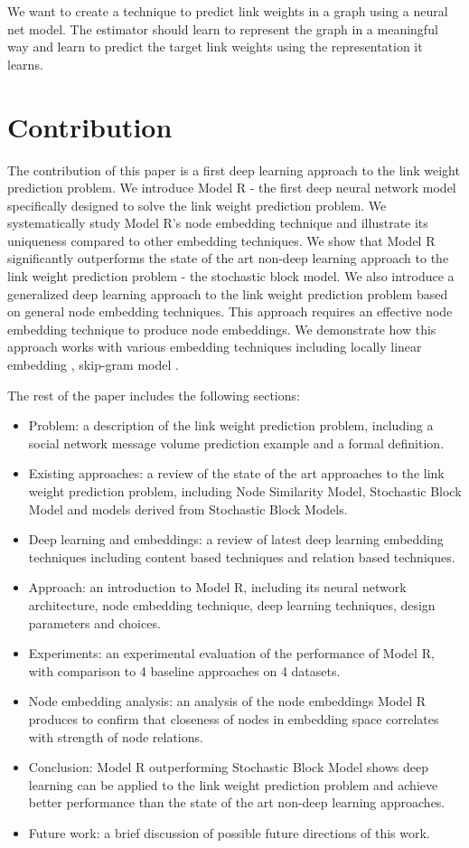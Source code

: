 \documentclass[12pt]{WSUThesis}
\theoremstyle{definition}
\begin{document}
We want to create a technique to predict link weights in a graph using a 
neural net model.
The estimator should learn to represent the graph in a meaningful way and learn to predict the target link weights using the representation it learns.

\section{Contribution}
The contribution of this paper is
a first deep learning approach to the link weight prediction problem.
We introduce Model R - the first deep neural network model specifically designed to solve the link weight prediction problem.
We systematically study Model R's node embedding technique and illustrate its uniqueness compared to other embedding techniques.
We show that Model R significantly outperforms the state of the art non-deep learning approach to the link weight prediction problem - the stochastic block model.
We also introduce a generalized deep learning approach to the link weight prediction problem based on general node embedding techniques.
This approach requires an effective node embedding technique to produce node embeddings.
We demonstrate how this approach works with various embedding techniques including locally linear embedding \citep{roweis2000nonlinear}, skip-gram model \citep{grover2016node2vec}.

The rest of the paper includes the following sections:
\begin{itemize}
	\item Problem: a description of the link weight prediction problem, including a social network message volume prediction example and a formal definition.
	\item Existing approaches: a review of the state of the art approaches to the link weight prediction problem, including Node Similarity Model, Stochastic Block Model and models derived from Stochastic Block Models.
	\item Deep learning and embeddings: a review of latest deep learning embedding techniques including content based techniques and relation based techniques.
	\item Approach: an introduction to Model R, including its neural network architecture, node embedding technique, deep learning techniques, design parameters and choices.
	\item Experiments: an experimental evaluation of the performance of Model R, with comparison to 4 baseline approaches on 4 datasets.
	\item Node embedding analysis: an analysis of the node embeddings Model R produces to confirm that closeness of nodes in embedding space correlates with strength of node relations.
	\item Conclusion: Model R outperforming Stochastic Block Model shows deep learning can be applied to the link weight prediction problem and achieve better performance than the state of the art non-deep learning approaches.
	\item Future work: a brief discussion of possible future directions of this work.
\end{itemize}
\end{document}

